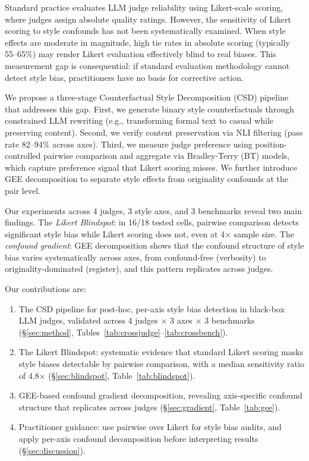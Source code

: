 \documentclass[10pt,twocolumn]{article}
\begin{document}
Standard practice evaluates LLM judge reliability using Likert-scale scoring, where judges assign absolute quality ratings.
However, the sensitivity of Likert scoring to style confounds has not been systematically examined.
When style effects are moderate in magnitude, high tie rates in absolute scoring (typically 55--65\%) may render Likert evaluation effectively blind to real biases.
This measurement gap is consequential: if standard evaluation methodology cannot detect style bias, practitioners have no basis for corrective action.

We propose a three-stage Counterfactual Style Decomposition (CSD) pipeline that addresses this gap.
First, we generate binary style counterfactuals through constrained LLM rewriting (e.g., transforming formal text to casual while preserving content).
Second, we verify content preservation via NLI filtering (pass rate 82--94\% across axes).
Third, we measure judge preference using position-controlled pairwise comparison and aggregate via Bradley-Terry (BT) models, which capture preference signal that Likert scoring misses.
We further introduce GEE decomposition to separate style effects from originality confounds at the pair level.

Our experiments across 4 judges, 3 style axes, and 3 benchmarks reveal two main findings.
The \textit{Likert Blindspot}: in 16/18 tested cells, pairwise comparison detects significant style bias while Likert scoring does not, even at 4$\times$ sample size.
The \textit{confound gradient}: GEE decomposition shows that the confound structure of style bias varies systematically across axes, from confound-free (verbosity) to originality-dominated (register), and this pattern replicates across judges.

Our contributions are:
\begin{enumerate}[nosep,leftmargin=*]
\item The CSD pipeline for post-hoc, per-axis style bias detection in black-box LLM judges, validated across 4 judges $\times$ 3 axes $\times$ 3 benchmarks (\S\ref{sec:method}, Tables~\ref{tab:crossjudge}--\ref{tab:crossbench}).
\item The Likert Blindspot: systematic evidence that standard Likert scoring masks style biases detectable by pairwise comparison, with a median sensitivity ratio of 4.8$\times$ (\S\ref{sec:blindspot}, Table~\ref{tab:blindspot}).
\item GEE-based confound gradient decomposition, revealing axis-specific confound structure that replicates across judges (\S\ref{sec:gradient}, Table~\ref{tab:gee}).
\item Practitioner guidance: use pairwise over Likert for style bias audits, and apply per-axis confound decomposition before interpreting results (\S\ref{sec:discussion}).
\end{enumerate}
\end{document}
